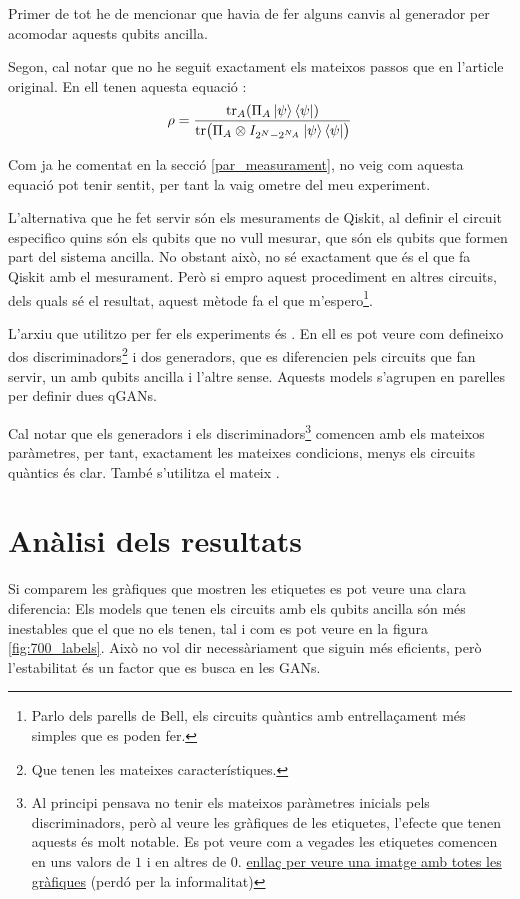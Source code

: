 Primer de tot he de mencionar que havia de fer alguns canvis al generador per acomodar aquests qubits ancilla. 

Segon, cal notar que no he seguit exactament els mateixos passos que en l'article original. En ell tenen aquesta equació \cite{QGAN_exp}: 
\begin{equation*}
\rho = \frac{\tr_A(\Pi_A \ket{\psi}\bra{\psi})}{\tr(\Pi_A\otimes I_{2^N-2^{N_A}}\ket{\psi}\bra{\psi})}
\end{equation*}

Com ja he comentat en la secció \ref{par_measurament}, no veig com aquesta equació pot tenir sentit, per tant la vaig ometre del meu experiment. 

L'alternativa que he fet servir són els mesuraments de Qiskit, al definir el circuit especifico quins són els qubits que no vull mesurar, que són els qubits que formen part del sistema ancilla. No obstant això, no sé exactament que és el que fa Qiskit amb el mesurament. Però si empro aquest procediment en altres circuits, dels quals sé el resultat, aquest mètode fa el que m'espero\footnote{Parlo dels parells de Bell, els circuits quàntics amb entrellaçament més simples que es poden fer.}.

L'arxiu que utilitzo per fer els experiments és . En ell es pot veure com defineixo dos discriminadors\footnote{Que tenen les mateixes característiques.} i dos generadors, que es diferencien pels circuits que fan servir, un amb qubits ancilla i l'altre sense. Aquests models s'agrupen en parelles per definir dues qGANs.

Cal notar que els generadors i els discriminadors\footnote{Al principi pensava no tenir els mateixos paràmetres inicials pels discriminadors, però al veure les gràfiques de les etiquetes, l'efecte que tenen aquests és molt notable. Es pot veure com a vegades les etiquetes comencen en uns valors de $1$ i en altres de $0$. \href{https://drive.google.com/file/d/1kYZ1vmNYU17sofNluXFYnoATLfY5B0jG/view?usp=sharing}{enllaç per veure una imatge amb totes les gràfiques} (perdó per la informalitat)} comencen amb els mateixos paràmetres, per tant, exactament les mateixes condicions, menys els circuits quàntics és clar. També s'utilitza el mateix .

\section{Anàlisi dels resultats}
Si comparem les gràfiques que mostren les etiquetes es pot veure una clara diferencia: Els models que tenen els circuits amb els qubits ancilla són més inestables que el que no els tenen, tal i com es pot veure en la figura \ref{fig:700_labels}. Això no vol dir necessàriament que siguin més eficients, però l'estabilitat és un factor que es busca en les GANs.

